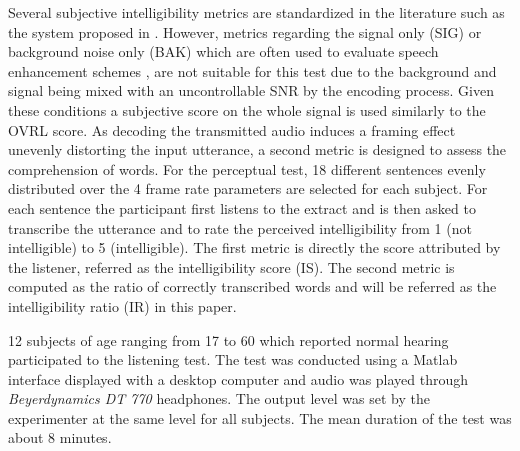 \documentclass[sensors,article,submit,moreauthors,pdftex,10pt,a4paper]{mdpi}
\begin{document}
Several subjective intelligibility metrics are standardized in the literature such as the system proposed in \cite{itup835}. However, metrics regarding the signal only (SIG) or background noise only (BAK) which are often used to evaluate speech enhancement schemes \citep{ntalampiras2008}, are not suitable for this test due to the background and signal being mixed with an uncontrollable SNR by the encoding process. Given these conditions a subjective score on the whole signal is used similarly to the OVRL score. As decoding the transmitted audio induces a framing effect unevenly distorting the input utterance, a second metric is designed to assess the comprehension of words. For the perceptual test, 18 different sentences evenly distributed over the 4 frame rate parameters are selected for each subject. For each sentence the participant first listens to the extract and is then asked to transcribe the utterance and to rate the perceived intelligibility from 1 (not intelligible) to 5 (intelligible). The first metric is directly the score attributed by the listener, referred as the intelligibility score (IS). The second metric is computed as the ratio of correctly transcribed words and will be referred as the intelligibility ratio (IR) in this paper.

12 subjects of age ranging from 17 to 60 which reported normal hearing participated to the listening test. The test was conducted using a Matlab interface displayed with a desktop computer and audio was played through \textit{Beyerdynamics DT 770} headphones. The output level was set by the experimenter at the same level for all subjects. The mean duration of the test was about 8 minutes.
\end{document}
